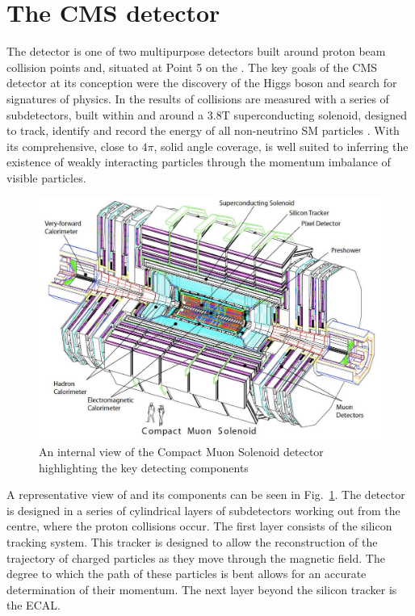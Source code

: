 \section{The CMS detector} \label{sec:cms}

The \CMS detector is one of two multipurpose
detectors built around proton beam collision points and,
situated at Point 5 on the \LHC. The key goals of the CMS detector at
its conception were the discovery of the \SM Higgs boson and search
for signatures of \BSM physics. In \CMS the results of collisions are
measured with a series of subdetectors, built within and around a 3.8T
superconducting solenoid, designed to track, identify and record the
energy of all non-neutrino SM particles \cite{Bayatian:2006zz}. With
its comprehensive, close to $4\pi$, solid angle coverage, \CMS is well
suited to inferring the existence of weakly interacting particles
through the momentum imbalance of visible particles. 

\begin{figure}
\begin{center}
\includegraphics[width=0.8\linewidth]{figs/cms_detector} \end{center}
\caption{An internal view of the Compact Muon Solenoid detector
highlighting the key detecting components \cite{Bayatian:2006zz}}
\label{fig:CMS} \end{figure}

A representative view of \CMS and its components can be seen in
Fig.~\ref{fig:CMS}. The detector is designed in a series of
cylindrical layers of subdetectors working out from the centre, where
the proton collisions occur. The first layer consists of the silicon
tracking system. This tracker is designed to allow the reconstruction
of the trajectory of charged particles as they move through the
magnetic field. The degree to which the path of these particles is
bent allows for an accurate determination of their momentum. The next
layer beyond the silicon tracker is the ECAL. 

